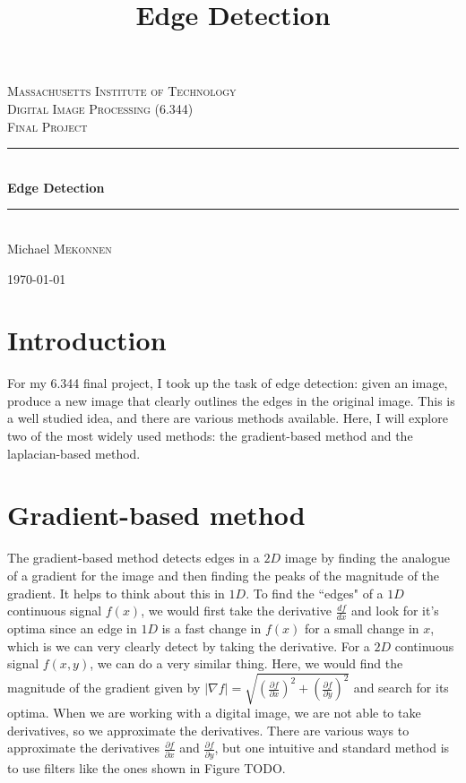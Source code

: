 \documentclass[12pt]{amsart}
\title{Edge Detection}
\newcommand{\HRule}{\rule{\linewidth}{0.5mm}}
\begin{document}
\begin{titlepage}
\begin{center}

\textsc{\LARGE Massachusetts Institute of Technology}\\[1.5cm]

\textsc{\Large Digital Image Processing (6.344) \\ Final Project}\\[0.5cm]

\HRule \\[0.4cm]
{ \huge \bfseries Edge Detection}\\[0.4cm]
\HRule \\[1.5cm]

\large Michael \textsc{Mekonnen}

\vfill

{\large \today}

\end{center}
\end{titlepage}

\maketitle

\section{Introduction}

For my 6.344 final project, I took up the task of edge detection: given an image, produce a new image that clearly outlines the edges in the original image. This is a well studied idea, and there are various methods available. Here, I will explore two of the most widely used methods: the gradient-based method and the laplacian-based method.

\section{Gradient-based method}

The gradient-based method detects edges in a $2D$ image by finding the analogue of a gradient for the image and then finding the peaks of the magnitude of the gradient. It helps to think about this in $1D$. To find the ``edges" of a $1D$ continuous signal $f(x)$, we would first take the derivative $\frac{df}{dx}$ and look for it's optima since an edge in $1D$ is a fast change in $f(x)$ for a small change in $x$, which is we can very clearly detect by taking the derivative. For a $2D$ continuous signal $f(x,y)$, we can do a very similar thing. Here, we would find the magnitude of the gradient given by $|\nabla f| = \sqrt{(\frac{\partial f}{\partial x})^2 + (\frac{\partial f}{\partial y})^2}$ and search for its optima. When we are working with a digital image, we are not able to take derivatives, so we approximate the derivatives. There are various ways to approximate the derivatives $\frac{\partial f}{\partial x}$ and $\frac{\partial f}{\partial y}$, but one intuitive and standard method is to use filters like the ones shown in Figure TODO.
\end{document}
